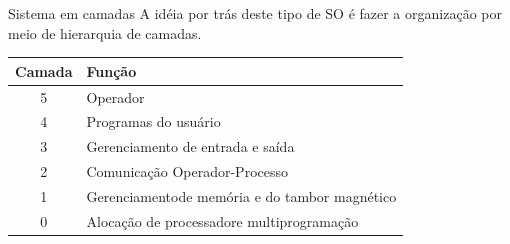 \documentclass{beamer}
\begin{document}
\begin{frame}{Sistema em camadas}
    A idéia por trás deste tipo de SO é fazer a organização por meio de hierarquia de camadas.

    \vspace{1cm}

    \begin{table}
        \centering
        \begin{tabular}{|c|l|}
            \hline
            \textbf{Camada} & \textbf{Função}                               \\
            \hline
            5               & Operador                                      \\
            \hline
            4               & Programas do usuário                          \\
            \hline
            3               & Gerenciamento de entrada e saída              \\
            \hline
            2               & Comunicação Operador-Processo                 \\
            \hline
            1               & Gerenciamentode memória e do tambor magnético \\
            \hline
            0               & Alocação de processadore multiprogramação     \\
            \hline
        \end{tabular}
    \end{table}

\end{frame}
\end{document}

